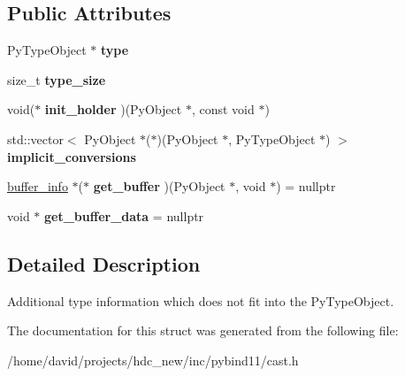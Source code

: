 \subsection*{Public Attributes}
\begin{DoxyCompactItemize}
\item 
Py\+Type\+Object $\ast$ {\bfseries type}\hypertarget{structtype__info_a9d303522ded86597dda91813722a39cc}{}\label{structtype__info_a9d303522ded86597dda91813722a39cc}

\item 
size\+\_\+t {\bfseries type\+\_\+size}\hypertarget{structtype__info_a5030f67ec35a633be08c1b2dc868975b}{}\label{structtype__info_a5030f67ec35a633be08c1b2dc868975b}

\item 
void($\ast$ {\bfseries init\+\_\+holder} )(Py\+Object $\ast$, const void $\ast$)\hypertarget{structtype__info_a726da96703862148757cb3829dea82df}{}\label{structtype__info_a726da96703862148757cb3829dea82df}

\item 
std\+::vector$<$ Py\+Object $\ast$($\ast$)(Py\+Object $\ast$, Py\+Type\+Object $\ast$) $>$ {\bfseries implicit\+\_\+conversions}\hypertarget{structtype__info_a2c4a2da568f4da56ca558e38a1b71e65}{}\label{structtype__info_a2c4a2da568f4da56ca558e38a1b71e65}

\item 
\hyperlink{structbuffer__info}{buffer\+\_\+info} $\ast$($\ast$ {\bfseries get\+\_\+buffer} )(Py\+Object $\ast$, void $\ast$) = nullptr\hypertarget{structtype__info_ae6e0ffbd11cb347896494ead333b8e4d}{}\label{structtype__info_ae6e0ffbd11cb347896494ead333b8e4d}

\item 
void $\ast$ {\bfseries get\+\_\+buffer\+\_\+data} = nullptr\hypertarget{structtype__info_a610a9a58683d2cb70158fd084bd1f30b}{}\label{structtype__info_a610a9a58683d2cb70158fd084bd1f30b}

\end{DoxyCompactItemize}


\subsection{Detailed Description}
Additional type information which does not fit into the Py\+Type\+Object. 

The documentation for this struct was generated from the following file\+:\begin{DoxyCompactItemize}
\item 
/home/david/projects/hdc\+\_\+new/inc/pybind11/cast.\+h\end{DoxyCompactItemize}
